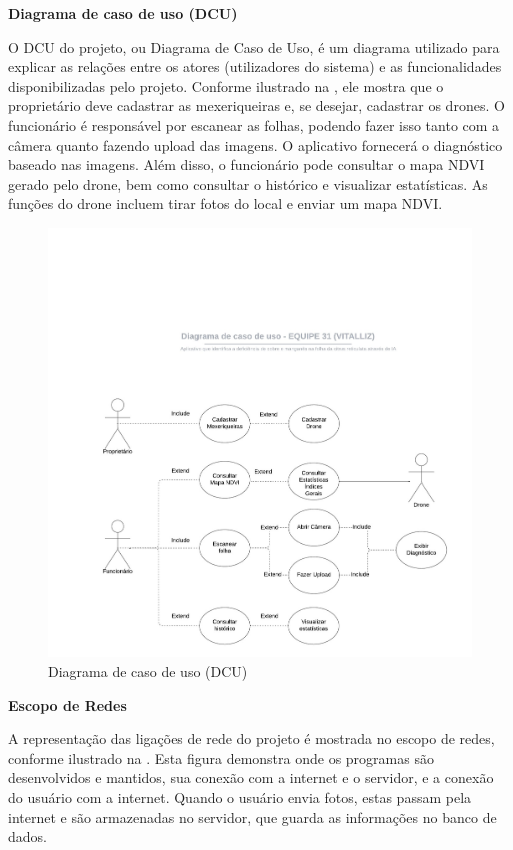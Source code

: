 \textbf{Diagrama de caso de uso (DCU)}

O DCU do projeto, ou Diagrama de Caso de Uso, é um diagrama utilizado para explicar as relações entre os atores (utilizadores do sistema) e as funcionalidades disponibilizadas pelo projeto. Conforme ilustrado na , ele mostra que o proprietário deve cadastrar as mexeriqueiras e, se desejar, cadastrar os drones. O funcionário é responsável por escanear as folhas, podendo fazer isso tanto com a câmera quanto fazendo upload das imagens. O aplicativo fornecerá o diagnóstico baseado nas imagens. Além disso, o funcionário pode consultar o mapa NDVI gerado pelo drone, bem como consultar o histórico e visualizar estatísticas. As funções do drone incluem tirar fotos do local e enviar um mapa NDVI.



\begin{figure}[H]
\centering
\caption{Diagrama de caso de uso (DCU)}%
\label{fig:dcu}
\includegraphics[width=0.8\linewidth]{Illustrations/dcu.jpeg}
\end{figure}

\textbf{Escopo de Redes}

A representação das ligações de rede do projeto é mostrada no escopo de redes, conforme ilustrado na . Esta figura demonstra onde os programas são desenvolvidos e mantidos, sua conexão com a internet e o servidor, e a conexão do usuário com a internet. Quando o usuário envia fotos, estas passam pela internet e são armazenadas no servidor, que guarda as informações no banco de dados.

